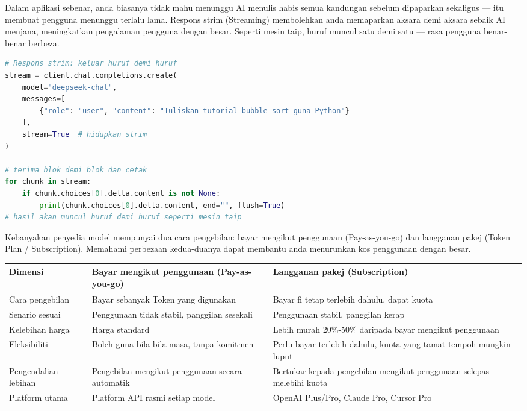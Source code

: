 
Dalam aplikasi sebenar, anda biasanya tidak mahu menunggu AI menulis habis semua kandungan sebelum dipaparkan sekaligus — itu membuat pengguna menunggu terlalu lama. Respons strim (Streaming) membolehkan anda memaparkan aksara demi aksara sebaik AI menjana, meningkatkan pengalaman pengguna dengan besar. Seperti mesin taip, huruf muncul satu demi satu — rasa pengguna benar-benar berbeza.

\begin{lstlisting}[language=Python]
# Respons strim: keluar huruf demi huruf
stream = client.chat.completions.create(
    model="deepseek-chat",
    messages=[
        {"role": "user", "content": "Tuliskan tutorial bubble sort guna Python"}
    ],
    stream=True  # hidupkan strim
)

# terima blok demi blok dan cetak
for chunk in stream:
    if chunk.choices[0].delta.content is not None:
        print(chunk.choices[0].delta.content, end="", flush=True)
# hasil akan muncul huruf demi huruf seperti mesin taip
\end{lstlisting}


Kebanyakan penyedia model mempunyai dua cara pengebilan: bayar mengikut penggunaan (Pay-as-you-go) dan langganan pakej (Token Plan / Subscription). Memahami perbezaan kedua-duanya dapat membantu anda menurunkan kos penggunaan dengan besar.


\begin{center}
\begin{tabularx}{\linewidth}{|X|X|X|}
\hline
\textbf{Dimensi} & \textbf{Bayar mengikut penggunaan (Pay-as-you-go)} & \textbf{Langganan pakej (Subscription)} \tabularnewline
\hline
Cara pengebilan & Bayar sebanyak Token yang digunakan & Bayar fi tetap terlebih dahulu, dapat kuota \tabularnewline
Senario sesuai & Penggunaan tidak stabil, panggilan sesekali & Penggunaan stabil, panggilan kerap \tabularnewline
Kelebihan harga & Harga standard & Lebih murah 20\%-50\% daripada bayar mengikut penggunaan \tabularnewline
Fleksibiliti & Boleh guna bila-bila masa, tanpa komitmen & Perlu bayar terlebih dahulu, kuota yang tamat tempoh mungkin luput \tabularnewline
Pengendalian lebihan & Pengebilan mengikut penggunaan secara automatik & Bertukar kepada pengebilan mengikut penggunaan selepas melebihi kuota \tabularnewline
Platform utama & Platform API rasmi setiap model & OpenAI Plus/Pro, Claude Pro, Cursor Pro \tabularnewline
\hline
\end{tabularx}
\end{center}


